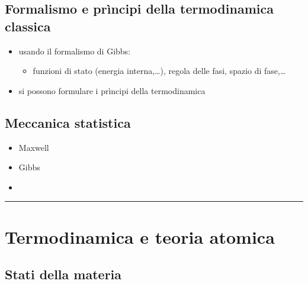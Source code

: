\documentclass[letterpaper,10pt,italian]{jupyterBook}
\begin{document}
\subsection{Formalismo e prìncipi della termodinamica classica}
\label{\detokenize{ch/thermodynamics/foundation-experiments:formalismo-e-principi-della-termodinamica-classica}}
\sphinxAtStartPar
{}
\begin{itemize}
\item {} 
\sphinxAtStartPar
usando il formalismo di Gibbs:
\begin{itemize}
\item {} 
\sphinxAtStartPar
funzioni di stato (energia interna,…), regola delle fasi, spazio di fase,…

\end{itemize}

\item {} 
\sphinxAtStartPar
si possono formulare i prìncipi della termodinamica

\end{itemize}


\subsection{Meccanica statistica}
\label{\detokenize{ch/thermodynamics/foundation-experiments:meccanica-statistica}}\begin{itemize}
\item {} 
\sphinxAtStartPar
Maxwell

\item {} 
\sphinxAtStartPar
Gibbs

\item {} 
\sphinxAtStartPar
{}

\end{itemize}


\bigskip\hrule\bigskip


\sphinxstepscope


\section{Termodinamica e teoria atomica}
\label{\detokenize{ch/thermodynamics/foundation-atomic-theory:termodinamica-e-teoria-atomica}}\label{\detokenize{ch/thermodynamics/foundation-atomic-theory:physics-hs-thermodynamics-foundation-atomic-theory}}\label{\detokenize{ch/thermodynamics/foundation-atomic-theory::doc}}

\subsection{Stati della materia}
\label{\detokenize{ch/thermodynamics/foundation-atomic-theory:stati-della-materia}}
\end{document}
